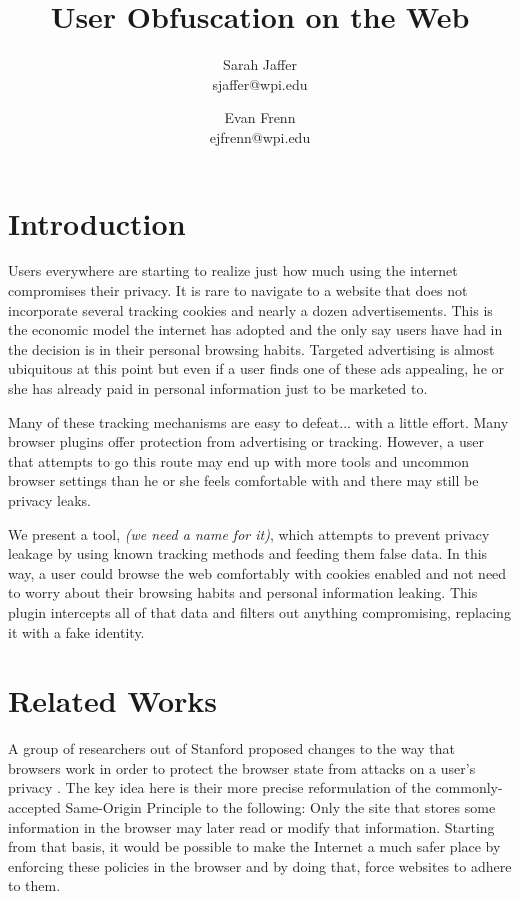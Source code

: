 \documentclass[11pt,twocolumn]{article}
\title{User Obfuscation on the Web}
\author{Sarah Jaffer\\sjaffer@wpi.edu \and Evan Frenn\\ejfrenn@wpi.edu}
\date{}
\begin{document}
\maketitle

\section{Introduction}
Users everywhere are starting to realize just how much using the internet compromises their privacy.  It is rare to navigate to a website that does not incorporate several tracking cookies and nearly a dozen advertisements.  This is the economic model the internet has adopted and the only say users have had in the decision is in their personal browsing habits.  Targeted advertising is almost ubiquitous at this point but even if a user finds one of these ads appealing, he or she has already paid in personal information just to be marketed to.

Many of these tracking mechanisms are easy to defeat... with a little effort.  Many browser plugins offer protection from advertising or tracking.  However, a user that attempts to go this route may end up with more tools and uncommon browser settings than he or she feels comfortable with and there may still be privacy leaks.

We present a tool, \textit{(we need a name for it)}, which attempts to prevent privacy leakage by using known tracking methods and feeding them false data.  In this way, a user could browse the web comfortably with cookies enabled and not need to worry about their browsing habits and personal information leaking.  This plugin intercepts all of that data and filters out anything compromising, replacing it with a fake identity.

\section{Related Works}

A group of researchers out of Stanford proposed changes to the way that browsers work in order to protect the browser state from attacks on a user's privacy \cite{Shankar:2006:DBB:1180405.1180426}.  The key idea here is their more precise reformulation of the commonly-accepted Same-Origin Principle to the following: Only the site that stores some information in the browser may later read or modify that information.  Starting from that basis, it would be possible to make the Internet a much safer place by enforcing these policies in the browser and by doing that, force websites to adhere to them.
\end{document}
